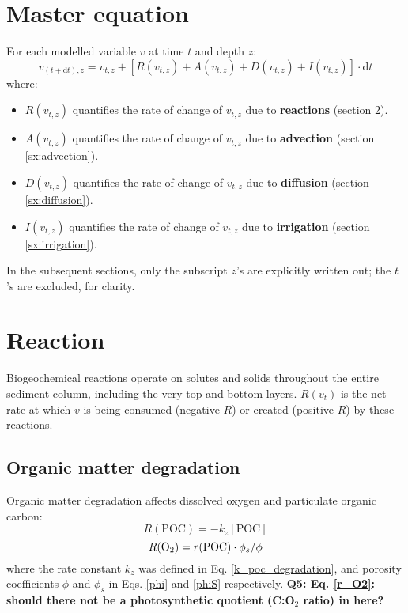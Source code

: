 \documentclass[a4paper]{article}
\newcommand{\D}[1]{\mathrm{d}#1}
\newcommand{\wtf}[1]{\textcolor{Cerulean}{\textbf{#1}}}
\begin{document}
\section{Master equation}

For each modelled variable $v$ at time $t$ and depth $z$:
\begin{equation}
v_{(t+\D{t}), z} = v_{t,z} + [R(v_{t,z}) + A(v_{t,z}) + D(v_{t,z}) + I(v_{t,z})] \cdot \D{t}
\end{equation}
where:
\begin{itemize}
  \item $R(v_{t,z})$ quantifies the rate of change of $v_{t,z}$ due to \textbf{reactions} (section \ref{sx:reaction}).
  \item $A(v_{t,z})$ quantifies the rate of change of $v_{t,z}$ due to \textbf{advection} (section \ref{sx:advection}).
  \item $D(v_{t,z})$ quantifies the rate of change of $v_{t,z}$ due to \textbf{diffusion} (section \ref{sx:diffusion}).
  \item $I(v_{t,z})$ quantifies the rate of change of $v_{t,z}$ due to \textbf{irrigation} (section \ref{sx:irrigation}).
\end{itemize}
In the subsequent sections, only the subscript $z$'s are explicitly written out; the $t$'s are excluded, for clarity.

\section{Reaction}\label{sx:reaction}

Biogeochemical reactions operate on solutes and solids throughout the entire sediment column, including the very top and bottom layers. $R(v_t)$ is the net rate at which $v$ is being consumed (negative $R$) or created (positive $R$) by these reactions.

\subsection{Organic matter degradation}

Organic matter degradation affects dissolved oxygen and particulate organic carbon:
\begin{equation}
R(\mathrm{POC}) = -k_z [\mathrm{POC}]
\end{equation}
\begin{equation}\label{r_O2}
R(\ce{O2}) = r(\mathrm{POC}) \cdot \phi_s / \phi
\end{equation}
where the rate constant $k_z$ was defined in Eq. \eqref{k_poc_degradation}, and porosity coefficients $\phi$ and $\phi_s$ in Eqs. \eqref{phi} and \eqref{phiS} respectively. \wtf{Q5: Eq. \eqref{r_O2}: should there not be a photosynthetic quotient (C:O$_2$ ratio) in here?}
\end{document}
